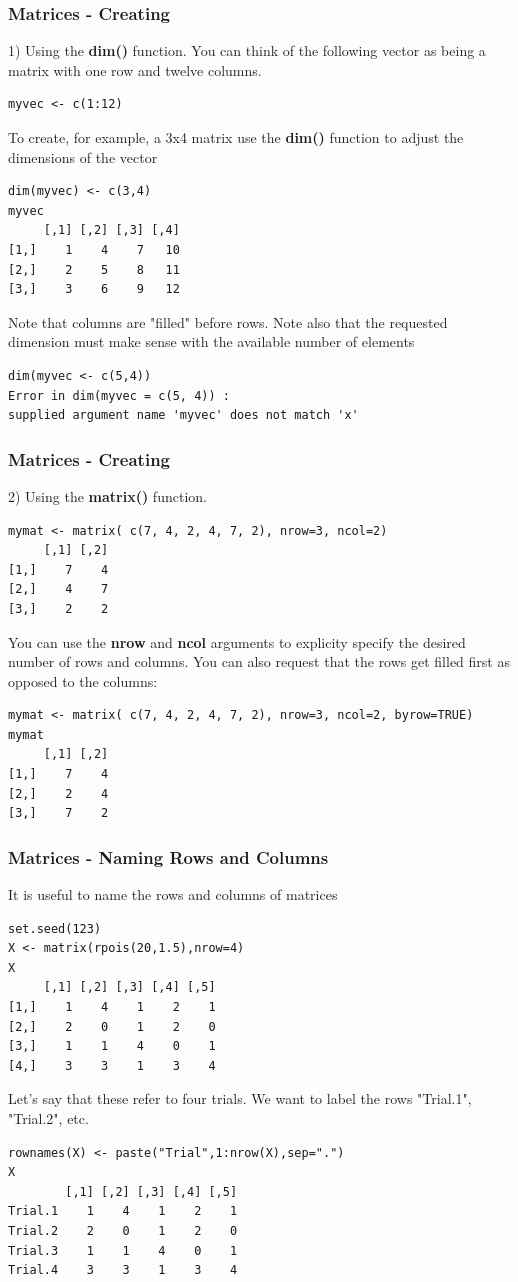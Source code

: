 \documentclass{beamer}
\begin{document}
\begin{frame}[fragile]
\frametitle{Matrices - Creating}
1) Using the \textbf{dim()} function. You can think of the following vector as being a matrix with one row and twelve columns. 
\footnotesize
\begin{verbatim}
myvec <- c(1:12)
\end{verbatim}
\normalsize
To create, for example, a 3x4 matrix use the \textbf{dim()} function to adjust the dimensions of the vector
\footnotesize
\begin{verbatim}
dim(myvec) <- c(3,4)
myvec
     [,1] [,2] [,3] [,4]
[1,]    1    4    7   10
[2,]    2    5    8   11
[3,]    3    6    9   12
\end{verbatim}
\normalsize
Note that columns are "filled" before rows. Note also that the requested dimension must make sense with the available number of elements
\footnotesize
\begin{verbatim}
dim(myvec <- c(5,4))
Error in dim(myvec = c(5, 4)) : 
supplied argument name 'myvec' does not match 'x'
\end{verbatim}
\end{frame}

\begin{frame}[fragile]
\frametitle{Matrices - Creating}
2) Using the \textbf{matrix()} function. 
\footnotesize
\begin{verbatim}
mymat <- matrix( c(7, 4, 2, 4, 7, 2), nrow=3, ncol=2) 
     [,1] [,2]
[1,]    7    4
[2,]    4    7
[3,]    2    2
\end{verbatim}
\normalsize
\vspace{0.25cm}
You can use the \textbf{nrow} and \textbf{ncol} arguments to explicity specify the desired number of rows and columns. You can also request that the rows get filled first as opposed to the columns:
\footnotesize
\begin{verbatim}
mymat <- matrix( c(7, 4, 2, 4, 7, 2), nrow=3, ncol=2, byrow=TRUE)
mymat
     [,1] [,2]
[1,]    7    4
[2,]    2    4
[3,]    7    2
\end{verbatim}
\normalsize
\end{frame}


\begin{frame}[fragile]
\frametitle{Matrices - Naming Rows and Columns}
It is useful to name the rows and columns of matrices
\footnotesize
\begin{verbatim}
set.seed(123)
X <- matrix(rpois(20,1.5),nrow=4)
X
     [,1] [,2] [,3] [,4] [,5]
[1,]    1    4    1    2    1
[2,]    2    0    1    2    0
[3,]    1    1    4    0    1
[4,]    3    3    1    3    4
\end{verbatim}
\normalsize
\vspace{0.25cm}
Let's say that these refer to four trials. We want to label the rows "Trial.1", "Trial.2", etc.
\footnotesize
\begin{verbatim}
rownames(X) <- paste("Trial",1:nrow(X),sep=".")
X
        [,1] [,2] [,3] [,4] [,5]
Trial.1    1    4    1    2    1
Trial.2    2    0    1    2    0
Trial.3    1    1    4    0    1
Trial.4    3    3    1    3    4
\end{verbatim}
\end{frame}
\end{document}
